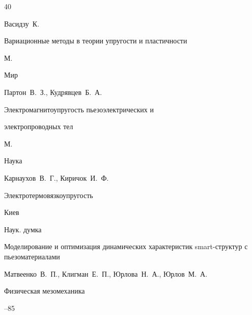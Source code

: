 \begin{thebibliography}{40}








\by Васидзу~К.

\book Вариационные методы в теории упругости и пластичности

\publaddr М.

\publ Мир






\by Партон~В.~З., Кудрявцев~Б.~А.

\book Электромагнитоупругость пьезоэлектрических и

электропроводных тел

\publaddr М.

\publ Наука






\by Карнаухов~В.~Г., Киричок~И.~Ф.

\book Электротермовязкоупругость

\publaddr Киев

\publ Наук. думка






\paper Моделирование и оптимизация динамических характеристик smart-структур с пьезоматериалами

\by Матвеенко~В.~П., Клигман~Е.~П., Юрлова~Н.~А., Юрлов~М.~А.

\jour Физическая мезомеханика




--85






\end{thebibliography}
